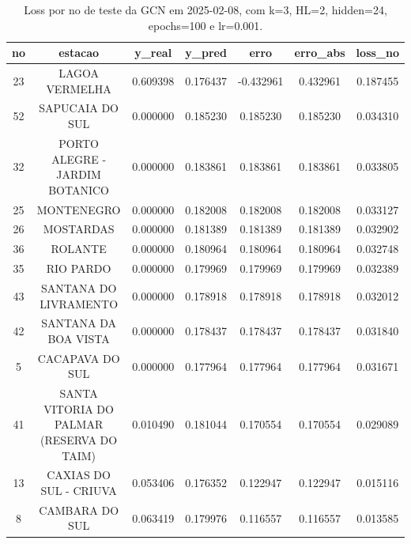 \begin{table}[h]
\centering
\caption{Loss por no de teste da GCN em 2025-02-08, com k=3, HL=2, hidden=24, epochs=100 e lr=0.001.}
\label{tab:gcn_loss_k3_hl2_h24_e100_d20250208}
\begin{tabular}{ccccccc}
\toprule
no & estacao & y\_real & y\_pred & erro & erro\_abs & loss\_no \\
\midrule
23 & LAGOA VERMELHA & 0.609398 & 0.176437 & -0.432961 & 0.432961 & 0.187455 \\
52 & SAPUCAIA DO SUL & 0.000000 & 0.185230 & 0.185230 & 0.185230 & 0.034310 \\
32 & PORTO ALEGRE - JARDIM BOTANICO & 0.000000 & 0.183861 & 0.183861 & 0.183861 & 0.033805 \\
25 & MONTENEGRO & 0.000000 & 0.182008 & 0.182008 & 0.182008 & 0.033127 \\
26 & MOSTARDAS & 0.000000 & 0.181389 & 0.181389 & 0.181389 & 0.032902 \\
36 & ROLANTE & 0.000000 & 0.180964 & 0.180964 & 0.180964 & 0.032748 \\
35 & RIO PARDO & 0.000000 & 0.179969 & 0.179969 & 0.179969 & 0.032389 \\
43 & SANTANA DO LIVRAMENTO & 0.000000 & 0.178918 & 0.178918 & 0.178918 & 0.032012 \\
42 & SANTANA DA BOA VISTA & 0.000000 & 0.178437 & 0.178437 & 0.178437 & 0.031840 \\
5 & CACAPAVA DO SUL & 0.000000 & 0.177964 & 0.177964 & 0.177964 & 0.031671 \\
41 & SANTA VITORIA DO PALMAR (RESERVA DO TAIM) & 0.010490 & 0.181044 & 0.170554 & 0.170554 & 0.029089 \\
13 & CAXIAS DO SUL - CRIUVA & 0.053406 & 0.176352 & 0.122947 & 0.122947 & 0.015116 \\
8 & CAMBARA DO SUL & 0.063419 & 0.179976 & 0.116557 & 0.116557 & 0.013585 \\
\bottomrule
\end{tabular}
\end{table}
